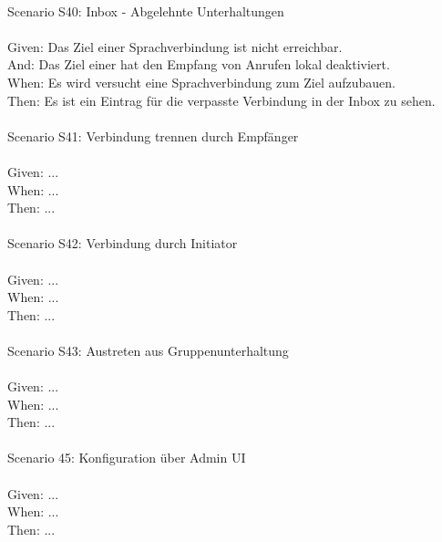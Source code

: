 \begin{tabbing}
    \\
    Scenario S40: \> \> \> Inbox - Abgelehnte Unterhaltungen \\ \\
    Given:  \> \> \> Das Ziel einer Sprachverbindung ist nicht erreichbar. \\
    And:  \> \> \> Das Ziel einer hat den Empfang von Anrufen lokal deaktiviert. \\
    When:   \> \> \> Es wird versucht eine Sprachverbindung zum Ziel aufzubauen.\\
    Then:   \> \> \> Es ist ein Eintrag für die verpasste Verbindung in der Inbox zu sehen.\\
    \\
    Scenario S41: \> \> \> Verbindung trennen durch Empfänger \\ \\
    Given:  \> \> \> ...\\
    When:   \> \> \> ...\\
    Then:   \> \> \> ...\\
    \\
    Scenario S42: \> \> \> Verbindung durch Initiator \\ \\
    Given:  \> \> \> ...\\
    When:   \> \> \> ...\\
    Then:   \> \> \> ...\\
    \\
    Scenario S43: \> \> \> Austreten aus Gruppenunterhaltung \\ \\
    Given:  \> \> \> ...\\
    When:   \> \> \> ...\\
    Then:   \> \> \> ...\\
    \\
    Scenario 45: \> \> \> Konfiguration über Admin UI \\ \\
    Given:  \> \> \> ...\\
    When:   \> \> \> ...\\
    Then:   \> \> \> ...\\
    \\
\end{tabbing}
\clearpage
